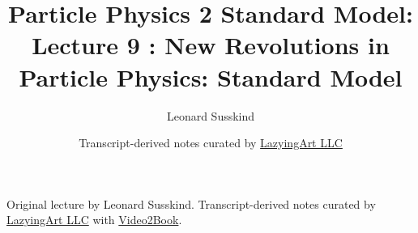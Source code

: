 \documentclass[11pt,oneside]{book}
\begin{document}
\frontmatter
\title{Particle Physics 2 Standard Model: Lecture 9 : New Revolutions in Particle Physics: Standard Model}
\author{Leonard Susskind}
\date{Transcript-derived notes curated by \href{https://lazying.art}{LazyingArt LLC}}
\maketitle
\begin{center}
\small Original lecture by Leonard Susskind. Transcript-derived notes curated by \href{https://lazying.art}{LazyingArt LLC} with \href{https://github.com/lachlanchen/Video2Book}{Video2Book}.
\end{center}
\clearpage
\mainmatter

\end{document}
